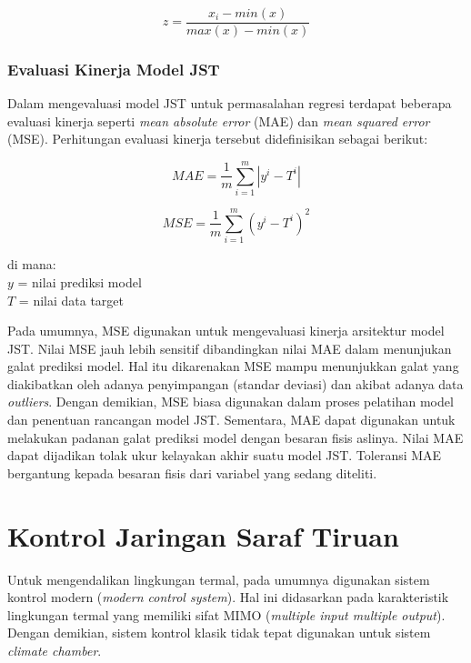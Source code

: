 \begin{equation} \label{eq:3:MinMaxScaler}
z = \frac{x_i - min(x)}{max(x) - min(x)}
\end{equation}

\subsubsection{Evaluasi Kinerja Model JST}

Dalam mengevaluasi model JST untuk permasalahan regresi terdapat beberapa evaluasi kinerja seperti \textit{mean absolute error} (MAE) dan \textit{mean squared error} (MSE). Perhitungan evaluasi kinerja tersebut didefinisikan sebagai berikut:

\begin{equation} \label{eq:3:MAEequation}
	MAE = \frac{1}{m} \sum_{i=1}^{m} |y^i-T^i|
\end{equation}

\begin{equation} \label{eq:3:MSEequation}
	MSE = \frac{1}{m} \sum_{i=1}^{m} (y^i-T^i)^2
\end{equation}

\noindent di mana:\\
$y$ = nilai prediksi model\\
$T$ = nilai data target

Pada umumnya, MSE digunakan untuk mengevaluasi kinerja arsitektur model JST. Nilai MSE jauh lebih sensitif dibandingkan nilai MAE dalam menunjukan galat prediksi model. Hal itu dikarenakan MSE mampu menunjukkan galat yang diakibatkan oleh adanya penyimpangan (standar deviasi) dan akibat adanya data \textit{outliers}. Dengan demikian, MSE biasa digunakan dalam proses pelatihan model dan penentuan rancangan model JST. Sementara, MAE dapat digunakan untuk melakukan padanan galat prediksi model dengan besaran fisis aslinya. Nilai MAE dapat dijadikan tolak ukur kelayakan akhir suatu model JST. Toleransi MAE bergantung kepada besaran fisis dari variabel yang sedang diteliti. \cite{HandsOnML}

\section{Kontrol Jaringan Saraf Tiruan}

Untuk mengendalikan lingkungan termal, pada umumnya digunakan sistem kontrol modern (\textit{modern control system}). Hal ini didasarkan pada karakteristik lingkungan termal yang memiliki sifat MIMO (\textit{multiple input multiple output}). Dengan demikian, sistem kontrol klasik tidak tepat digunakan untuk sistem \textit{climate chamber}.

